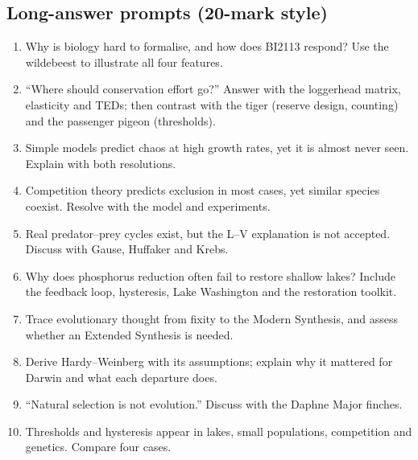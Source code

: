 \subsection*{Long-answer prompts (20-mark style)}
\begin{enumerate}[leftmargin=2.2em]
\item Why is biology hard to formalise, and how does BI2113 respond? Use the wildebeest to illustrate all four features.
\item ``Where should conservation effort go?'' Answer with the loggerhead matrix, elasticity and TEDs; then contrast with the
tiger (reserve design, counting) and the passenger pigeon (thresholds).
\item Simple models predict chaos at high growth rates, yet it is almost never seen. Explain with both resolutions.
\item Competition theory predicts exclusion in most cases, yet similar species coexist. Resolve with the model and experiments.
\item Real predator--prey cycles exist, but the L--V explanation is not accepted. Discuss with Gause, Huffaker and Krebs.
\item Why does phosphorus reduction often fail to restore shallow lakes? Include the feedback loop, hysteresis, Lake
Washington and the restoration toolkit.
\item Trace evolutionary thought from fixity to the Modern Synthesis, and assess whether an Extended Synthesis is needed.
\item Derive Hardy--Weinberg with its assumptions; explain why it mattered for Darwin and what each departure does.
\item ``Natural selection is not evolution.'' Discuss with the Daphne Major finches.
\item Thresholds and hysteresis appear in lakes, small populations, competition and genetics. Compare four cases.
\end{enumerate}
